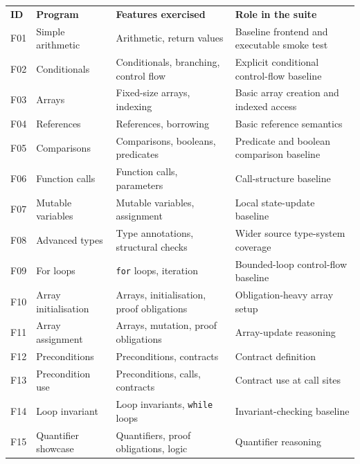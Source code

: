 \begin{table}[p]
  \centering
  \scriptsize
  \begin{tabular}{p{} p{} p{} p{}}
    \tablehline
    \textbf{ID} & \textbf{Program} & \textbf{Features exercised} & \textbf{Role in the suite} \\
    \tablehline
    F01 & Simple arithmetic
        & Arithmetic, return values
        & Baseline frontend and executable smoke test \\
    F02 & Conditionals
        & Conditionals, branching, control flow
        & Explicit conditional control-flow baseline \\
    F03 & Arrays
        & Fixed-size arrays, indexing
        & Basic array creation and indexed access \\
    F04 & References
        & References, borrowing
        & Basic reference semantics \\
    F05 & Comparisons
        & Comparisons, booleans, predicates
        & Predicate and boolean comparison baseline \\
    F06 & Function calls
        & Function calls, parameters
        & Call-structure baseline \\
    F07 & Mutable variables
        & Mutable variables, assignment
        & Local state-update baseline \\
    F08 & Advanced types
        & Type annotations, structural checks
        & Wider source type-system coverage \\
    F09 & For loops
        & \texttt{for} loops, iteration
        & Bounded-loop control-flow baseline \\
    F10 & Array initialisation
        & Arrays, initialisation, proof obligations
        & Obligation-heavy array setup \\
    F11 & Array assignment
        & Arrays, mutation, proof obligations
        & Array-update reasoning \\
    F12 & Preconditions
        & Preconditions, contracts
        & Contract definition \\
    F13 & Precondition use
        & Preconditions, calls, contracts
        & Contract use at call sites \\
    F14 & Loop invariant
        & Loop invariants, \texttt{while} loops
        & Invariant-checking baseline \\
    F15 & Quantifier showcase
        & Quantifiers, proof obligations, logic
        & Quantifier reasoning \\

\end{tabular}
\end{table}
